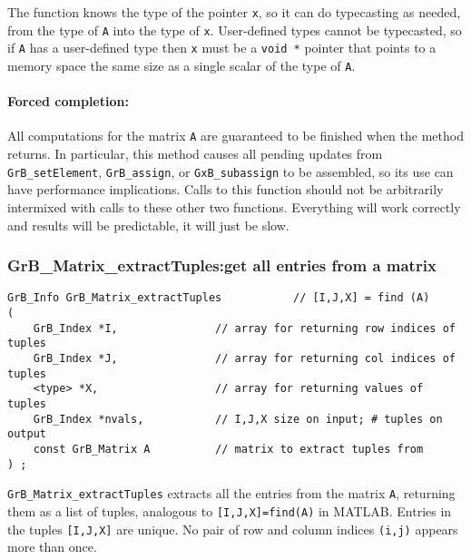 \documentclass[12pt]{article}
\begin{document}
The function knows the type of the pointer \verb'x', so it can do typecasting
as needed, from the type of \verb'A' into the type of \verb'x'.  User-defined
types cannot be typecasted, so if \verb'A' has a user-defined type then
\verb'x' must be a \verb'void *' pointer that points to a memory space the same
size as a single scalar of the type of \verb'A'.

\paragraph{Forced completion:}
All computations for the matrix \verb'A' are
guaranteed to be finished when the method returns.
%
In particular, this method causes all pending updates from
\verb'GrB_setElement', \verb'GrB_assign', or \verb'GxB_subassign' to be
assembled, so its use can have performance implications.  Calls to this
function should not be arbitrarily intermixed with calls to these other two
functions.  Everything will work correctly and results will be predictable, it
will just be slow.

\subsubsection{{\sf GrB\_Matrix\_extractTuples:}get all entries from a matrix}
\label{matrix_extractTuples}

\begin{mdframed}[userdefinedwidth=6in]
{\footnotesize
\begin{verbatim}
GrB_Info GrB_Matrix_extractTuples           // [I,J,X] = find (A)
(
    GrB_Index *I,               // array for returning row indices of tuples
    GrB_Index *J,               // array for returning col indices of tuples
    <type> *X,                  // array for returning values of tuples
    GrB_Index *nvals,           // I,J,X size on input; # tuples on output
    const GrB_Matrix A          // matrix to extract tuples from
) ;
\end{verbatim} } \end{mdframed}

\verb'GrB_Matrix_extractTuples' extracts all the entries from the matrix
\verb'A', returning them as a list of tuples, analogous to
\verb'[I,J,X]=find(A)' in MATLAB.  Entries in the tuples \verb'[I,J,X]' are
unique.  No pair of row and column indices \verb'(i,j)' appears more than once.
\end{document}
